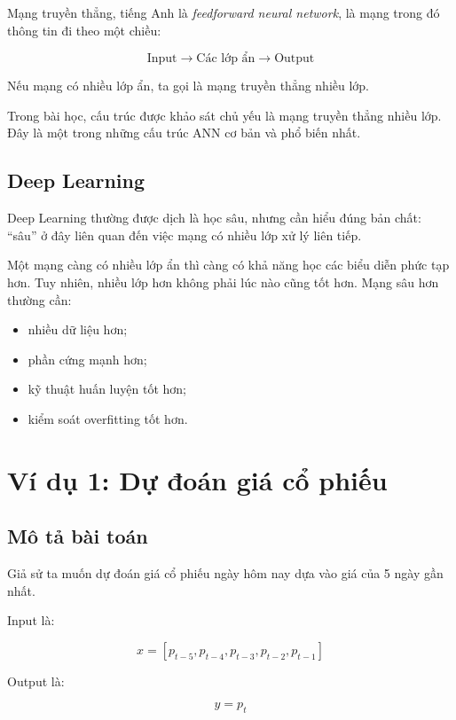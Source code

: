 \documentclass[12pt,a4paper]{report}
\begin{document}
Mạng truyền thẳng, tiếng Anh là \textit{feedforward neural network}, là mạng trong đó thông tin đi theo một chiều:

\[
    \text{Input} \rightarrow \text{Các lớp ẩn} \rightarrow \text{Output}
\]

Nếu mạng có nhiều lớp ẩn, ta gọi là mạng truyền thẳng nhiều lớp.

\begin{ghinho}
Trong bài học, cấu trúc được khảo sát chủ yếu là mạng truyền thẳng nhiều lớp. Đây là một trong những cấu trúc ANN cơ bản và phổ biến nhất.
\end{ghinho}

\section{Deep Learning}

Deep Learning thường được dịch là học sâu, nhưng cần hiểu đúng bản chất: ``sâu'' ở đây liên quan đến việc mạng có nhiều lớp xử lý liên tiếp.

Một mạng càng có nhiều lớp ẩn thì càng có khả năng học các biểu diễn phức tạp hơn. Tuy nhiên, nhiều lớp hơn không phải lúc nào cũng tốt hơn. Mạng sâu hơn thường cần:

\begin{itemize}
    \item nhiều dữ liệu hơn;
    \item phần cứng mạnh hơn;
    \item kỹ thuật huấn luyện tốt hơn;
    \item kiểm soát overfitting tốt hơn.
\end{itemize}

\chapter{Ví dụ 1: Dự đoán giá cổ phiếu}

\section{Mô tả bài toán}

Giả sử ta muốn dự đoán giá cổ phiếu ngày hôm nay dựa vào giá của 5 ngày gần nhất.

Input là:

\[
    x = [p_{t-5}, p_{t-4}, p_{t-3}, p_{t-2}, p_{t-1}]
\]

Output là:

\[
    y = p_t
\]
\end{document}
